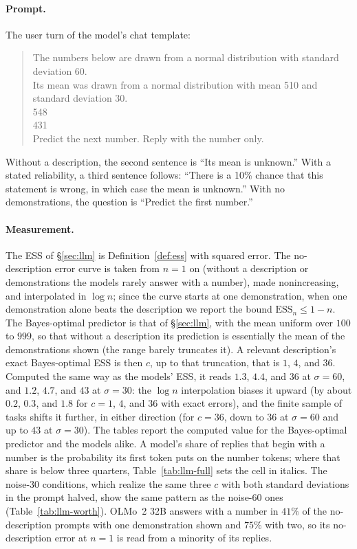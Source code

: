 \documentclass{article}
\newcommand{\ess}{\mathrm{ESS}}
\begin{document}
\paragraph{Prompt.} The user turn of the model's chat template:
\begin{quote}\scriptsize\ttfamily\raggedright
The numbers below are drawn from a normal distribution with standard deviation 60.\\
Its mean was drawn from a normal distribution with mean 510 and standard deviation 30.\\[3pt]
548\\
431\\[3pt]
Predict the next number. Reply with the number only.
\end{quote}

\noindent Without a description, the second sentence is ``Its mean is unknown.'' With a stated reliability, a third sentence follows: ``There is a 10\% chance that this statement is wrong, in which case the mean is unknown.'' With no demonstrations, the question is ``Predict the first number.''

\paragraph{Measurement.} The ESS of \S\ref{sec:llm} is Definition~\ref{def:ess} with squared error. The no-description error curve is taken from $n = 1$ on (without a description or demonstrations the models rarely answer with a number), made nonincreasing, and interpolated in $\log n$; since the curve starts at one demonstration, when one demonstration alone beats the description we report the bound $\ess_n \le 1 - n$. The Bayes-optimal predictor is that of \S\ref{sec:llm}, with the mean uniform over $100$ to $999$, so that without a description its prediction is essentially the mean of the demonstrations shown (the range barely truncates it). A relevant description's exact Bayes-optimal ESS is then $c$, up to that truncation, that is $1$, $4$, and $36$. Computed the same way as the models' ESS, it reads $1.3$, $4.4$, and $36$ at $\sigma = 60$, and $1.2$, $4.7$, and $43$ at $\sigma = 30$: the $\log n$ interpolation biases it upward (by about $0.2$, $0.3$, and $1.8$ for $c = 1$, $4$, and $36$ with exact errors), and the finite sample of tasks shifts it further, in either direction (for $c = 36$, down to $36$ at $\sigma = 60$ and up to $43$ at $\sigma = 30$). The tables report the computed value for the Bayes-optimal predictor and the models alike. A model's share of replies that begin with a number is the probability its first token puts on the number tokens; where that share is below three quarters, Table~\ref{tab:llm-full} sets the cell in italics. The noise-$30$ conditions, which realize the same three $c$ with both standard deviations in the prompt halved, show the same pattern as the noise-$60$ ones (Table~\ref{tab:llm-worth}). OLMo~2 32B answers with a number in $41\%$ of the no-description prompts with one demonstration shown and $75\%$ with two, so its no-description error at $n = 1$ is read from a minority of its replies.
\end{document}
